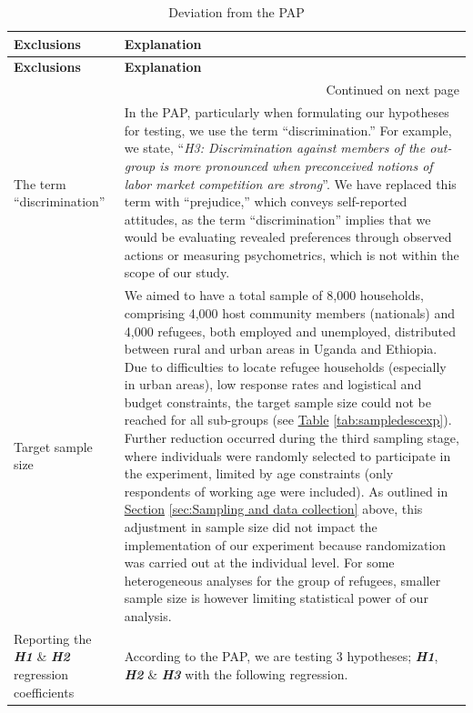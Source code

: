 \documentclass[a4paper,12pt]{article}
\begin{document}
\begin{appendix}
\begin{longtable}[c]{m{8em}m{12cm}}
    \caption{Deviation from the PAP} 
    \label{tab:deviation} \\
    \hline
    \textbf{Exclusions} & \textbf{Explanation} \\
    \hline\hline
    \endfirsthead
    \hline
    \textbf{Exclusions} & \textbf{Explanation} \\
    \hline\hline
    \endhead
    \multicolumn{2}{r}{Continued on next page} \\
    \endfoot
    \endlastfoot
    The term ``discrimination'' & In the PAP, particularly when formulating our hypotheses for testing, we use the term ``discrimination.'' For example, we state, ``\textit{H3: Discrimination against members of the out-group is more pronounced when preconceived notions of labor market competition are strong}''. We have replaced this term with ``prejudice,'' which conveys self-reported attitudes, as the term ``discrimination'' implies that we would be evaluating revealed preferences through observed actions or measuring psychometrics, which is not within the scope of our study. \\
    \hline
    Target sample size & We aimed to have a total sample of 8,000 households, comprising 4,000 host community members (nationals) and 4,000 refugees, both employed and unemployed, distributed between rural and urban areas in Uganda and Ethiopia. Due to difficulties to locate refugee households (especially in urban areas), low response rates and logistical and budget constraints, the target sample size could not be reached for all sub-groups (see \hyperref[tab:sampledescexp]{Table} \ref{tab:sampledescexp}). Further reduction occurred during the third sampling stage, where individuals were randomly selected to participate in the experiment, limited by age constraints (only respondents of working age were included). As outlined in \hyperref[sec:Sampling and data collection]{Section} \ref{sec:Sampling and data collection} above, this adjustment in sample size did not impact the implementation of our experiment because randomization was carried out at the individual level. For some heterogeneous analyses for the group of refugees, smaller sample size is however limiting statistical power of our analysis. \\
    \hline    
    Reporting the \textbf{\textit{H1}} \& \textbf{\textit{H2}} regression coefficients & According to the PAP, we are testing 3 hypotheses; \textbf{\textit{H1}}, \textbf{\textit{H2}} \& \textbf{\textit{H3}} with the following regression.

\end{longtable}
\end{appendix}
\end{document}
